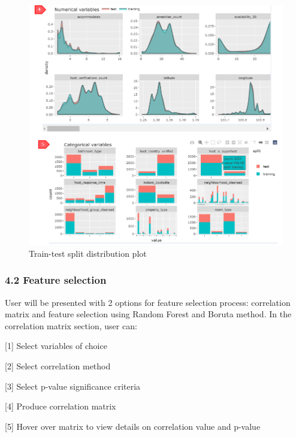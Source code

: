 \documentclass[
  12pt,
]{article}
\begin{document}
\begin{figure}[H]

{\centering \includegraphics[width=0.95\linewidth]{images/datasplit2} 

}

\caption{Train-test split distribution plot}\label{fig:unnamed-chunk-11}
\end{figure}

\hypertarget{feature-selection}{%
\subsubsection{4.2 Feature selection}\label{feature-selection}}

User will be presented with 2 options for feature selection process:
correlation matrix and feature selection using Random Forest and Boruta
method. In the correlation matrix section, user can:

{[}1{]} Select variables of choice

{[}2{]} Select correlation method

{[}3{]} Select p-value significance criteria

{[}4{]} Produce correlation matrix

{[}5{]} Hover over matrix to view details on correlation value and
p-value
\end{document}
